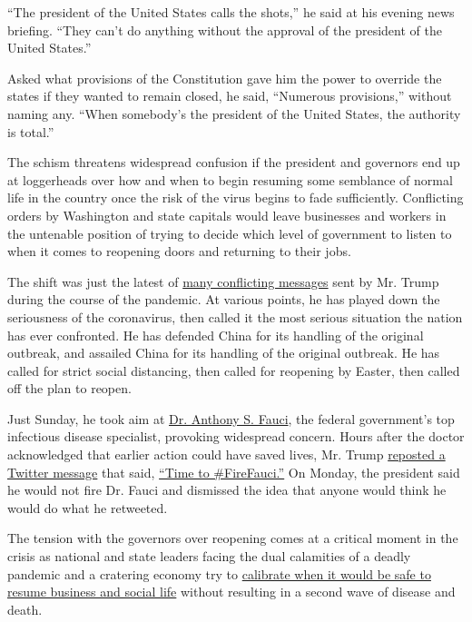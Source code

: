 ``The president of the United States calls the shots,'' he said at his
evening news briefing. ``They can't do anything without the approval of
the president of the United States.''

Asked what provisions of the Constitution gave him the power to override
the states if they wanted to remain closed, he said, ``Numerous
provisions,'' without naming any. ``When somebody's the president of the
United States, the authority is total.''

The schism threatens widespread confusion if the president and governors
end up at loggerheads over how and when to begin resuming some semblance
of normal life in the country once the risk of the virus begins to fade
sufficiently. Conflicting orders by Washington and state capitals would
leave businesses and workers in the untenable position of trying to
decide which level of government to listen to when it comes to reopening
doors and returning to their jobs.

The shift was just the latest of
\href{https://www.nytimes3xbfgragh.onion/2020/04/08/us/politics/trump-coronavirus-news-briefings.html}{many
conflicting messages} sent by Mr. Trump during the course of the
pandemic. At various points, he has played down the seriousness of the
coronavirus, then called it the most serious situation the nation has
ever confronted. He has defended China for its handling of the original
outbreak, and assailed China for its handling of the original outbreak.
He has called for strict social distancing, then called for reopening by
Easter, then called off the plan to reopen.

Just Sunday, he took aim at
\href{https://www.nytimes3xbfgragh.onion/2020/04/02/podcasts/the-daily/coronavirus-fauci.html?action=click\&module=Spotlight\&pgtype=Homepage}{Dr.
Anthony S. Fauci}, the federal government's top infectious disease
specialist, provoking widespread concern. Hours after the doctor
acknowledged that earlier action could have saved lives, Mr. Trump
\href{https://www.nytimes3xbfgragh.onion/2020/04/12/us/politics/trump-fauci-coronavirus.html}{reposted
a Twitter message} that said,
\href{https://twitter.com/realDonaldTrump/status/1249470237726081030}{``Time
to \#FireFauci.''} On Monday, the president said he would not fire Dr.
Fauci and dismissed the idea that anyone would think he would do what he
retweeted.

The tension with the governors over reopening comes at a critical moment
in the crisis as national and state leaders facing the dual calamities
of a deadly pandemic and a cratering economy try to
\href{https://www.nytimes3xbfgragh.onion/2020/04/10/us/politics/coronavirus-trump-economy.html}{calibrate
when it would be safe to resume business and social life} without
resulting in a second wave of disease and death.


